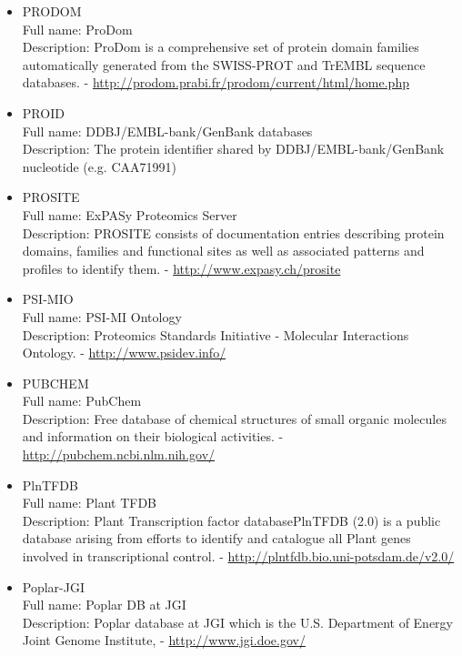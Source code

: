 \begin{itemize}
\item{PRODOM}\\ Full name: ProDom\\ Description: ProDom is a comprehensive set of protein domain families automatically generated from the SWISS-PROT and TrEMBL sequence databases. - 
\url{http://prodom.prabi.fr/prodom/current/html/home.php}

\item{PROID}\\ Full name: DDBJ/EMBL-bank/GenBank databases\\ Description: The protein identifier shared by DDBJ/EMBL-bank/GenBank nucleotide (e.g. CAA71991) 

\item{PROSITE}\\ Full name: ExPASy Proteomics Server\\ Description: PROSITE consists of documentation entries describing protein domains, families and functional sites as well as associated patterns and profiles to identify them. - 
\url{http://www.expasy.ch/prosite}

\item{PSI-MIO}\\ Full name: PSI-MI Ontology\\ Description: Proteomics Standards Initiative - Molecular Interactions Ontology. - 
\url{http://www.psidev.info/}

\item{PUBCHEM}\\ Full name: PubChem\\ Description: Free database of chemical structures of small organic molecules and information on their biological activities. - 
\url{http://pubchem.ncbi.nlm.nih.gov/}

\item{PlnTFDB}\\ Full name: Plant TFDB\\ Description: Plant Transcription factor databasePlnTFDB (2.0) is a public database arising from efforts to identify and catalogue all Plant genes involved in transcriptional control. - 
\url{http://plntfdb.bio.uni-potsdam.de/v2.0/}

\item{Poplar-JGI}\\ Full name: Poplar DB at JGI\\ Description: Poplar database at JGI which is the U.S. Department of Energy Joint Genome Institute, - 
\url{http://www.jgi.doe.gov/}


\end{itemize}
